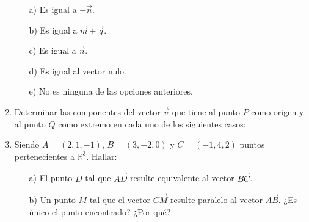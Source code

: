 \begin{enumerate}[\hspace{-3mm}$1)$]
\begin{minipage}{.6\textwidth}
\begin{center}
\end{center}
\end{minipage}\quad\begin{minipage}{.38\textwidth}
\begin{itemize}
\item[a)] Es igual a $-\vec n$.
\item[b)] Es igual a $\vec m+\vec q$.
\item[c)] Es igual a $\vec n$.
\item[d)] Es igual al vector nulo.
\item[e)] No es ninguna de las opciones anteriores.
\end{itemize}
\end{minipage}

\item Determinar las componentes del vector $\vec v$ que tiene al punto $P$ como origen y al punto $Q$ como extremo en cada uno de los siguientes casos:
\begin{enumerate}[a)]
\end{enumerate}

\item Siendo $A=(2,1,-1)$, $B=(3,-2,0)$ y $C=(-1,4,2)$ puntos pertenecientes a $\mathbb{R}^3$. Hallar:
\begin{itemize}
\item[a)] El punto $D$ tal que $\overrightarrow{AD}$ resulte equivalente al vector $\overrightarrow{BC}$.
\item[b)] Un punto $M$ tal que el vector $\overrightarrow{CM}$ resulte paralelo al vector $\overrightarrow{AB}$. ¿Es único el punto encontrado? ¿Por qué?
\end{itemize}


\end{enumerate}
